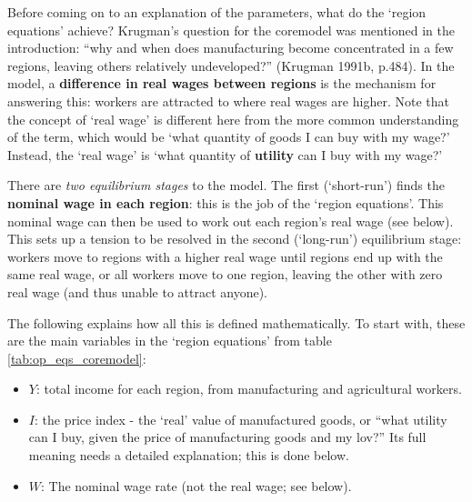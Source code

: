   

Before coming on to an explanation of the parameters, what do the `region equations' achieve? Krugman's question for the \gls{coremodel} was mentioned in the introduction: ``why and when does manufacturing become concentrated in a few regions, leaving others relatively undeveloped?'' (Krugman 1991b, p.484). In the model, a \textbf{difference in real wages between regions} is the mechanism for answering this: workers are attracted to where real wages are higher. Note that the concept of `real wage' is different here from the more common understanding of the term, which would be `what quantity of goods I can buy with my wage?' Instead, the `real wage' is `what quantity of \textbf{utility} can I buy with my wage?'

There are \emph{two equilibrium stages} to the model. The first (`short-run') finds the \textbf{nominal wage in each region}: this is the job of the `region equations'. This nominal wage can then be used to work out each region's real wage (see below). This sets up a tension to be resolved in the second (`long-run') equilibrium stage: workers move to regions with a higher real wage until regions end up with the same real wage, or all workers move to one region, leaving the other with zero real wage (and thus unable to attract anyone). 

The following explains how all this is defined mathematically. To start with, these are the main variables in the `region equations' from table \ref{tab:op_eqs_coremodel}:

\begin{itemize}
	\item $Y$: total income for each region, from manufacturing and agricultural workers.
	\item $I$: the price index - the `real' value of manufactured goods, or ``what utility can I buy, given the price of manufacturing goods and my \gls{lov}?'' Its full meaning needs a detailed explanation; this is done below.
	\item $W$: The nominal wage rate (not the real wage; see below). 
\end{itemize}

